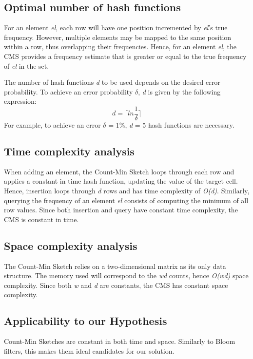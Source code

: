 \subsection*{Optimal number of hash functions} 
For an element \textit{el}, each row will have one position incremented by \textit{el}'s true frequency. However, multiple elements may be mapped to the same position within a row, thus overlapping their frequencies. Hence, for an element \textit{el}, the CMS provides a frequency estimate that is greater or equal to the true frequency of \textit{el} in the set.

The number of hash functions \textit{d} to be used depends on the desired error probability. To achieve an error probability $\delta$, \textit{d} is given by the following expression:
\begin{equation}
    d = \lceil ln \frac{1}{\delta} \rceil
\end{equation}
For example, to achieve an error $\delta$ = 1\%, \textit{d} = 5 hash functions are necessary.

\subsection*{Time complexity analysis}
When adding an element, the Count-Min Sketch loops through each row and applies a constant in time hash function, updating the value of the target cell. Hence, insertion loops through \textit{d} rows and has time complexity of \textit{O(d)}. Similarly, querying the frequency of an element \textit{el} consists of computing the minimum of all row values. Since both insertion and query have constant time complexity, the CMS is constant in time.

\subsection*{Space complexity analysis}
The Count-Min Sketch relies on a two-dimensional matrix as its only data structure. The memory used will correspond to the \textit{wd} counts, hence \textit{O(wd)} space complexity. Since both \textit{w} and \textit{d} are constants, the CMS has constant space complexity.

\subsection*{Applicability to our Hypothesis}
Count-Min Sketches are constant in both time and space. Similarly to Bloom filters, this makes them ideal candidates for our solution. 

